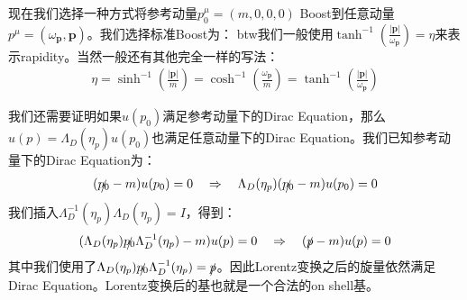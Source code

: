 现在我们选择一种方式将参考动量$ p_0^\mu = (m,0,0,0) $ Boost到任意动量$ p^\mu =
(\omega_{\mathbf{p}},\mathbf{p}) $。我们选择标准Boost为：
btw我们一般使用$\tanh^{-1}\left(\frac{|\mathbf{p}|}{\omega_{\mathbf{p}}}\right)
= \eta $来表示rapidity。当然一般还有其他完全一样的写法：
\begin{align}
  \eta=\sinh^{-1}\left(\frac{|\mathbf{p}|}{m}\right)=\cosh^{-1}\left(\frac{\omega_{\mathbf{p}}}{m}\right)=\tanh^{-1}\left(\frac{|\mathbf{p}|}{\omega_{\mathbf{p}}}\right)
\end{align}

\bigskip
{}

我们还需要证明如果$ u(p_0) $满足参考动量下的Dirac Equation，那么$ u(p) =
\Lambda_D(\eta_p) u(p_0) $也满足任意动量下的Dirac Equation。我们已知参考动量下的Dirac Equation为：
\begin{align}
  (\slashed{p_0}-m)u(p_0)=0\quad \Rightarrow \quad
  \Lambda_D(\eta_p)(\slashed{p_0}-m)u(p_0)=0
\end{align}
我们插入$  \Lambda_D^{-1}(\eta_p)\Lambda_D(\eta_p) = I $，得到：
\begin{align}
  (\Lambda_D(\eta_p)\slashed{p_0}\Lambda_D^{-1}(\eta_p)-m)u(p)=0 \quad
  \Rightarrow \quad (\slashed{p}-m)u(p)=0
\end{align}
其中我们使用了$ \Lambda_D(\eta_p)\slashed{p_0}\Lambda_D^{-1}(\eta_p) = \slashed{p}
$。因此Lorentz变换之后的旋量依然满足Dirac Equation。Lorentz变换后的基也就是一个合法的on shell基。

\bigskip
{}


